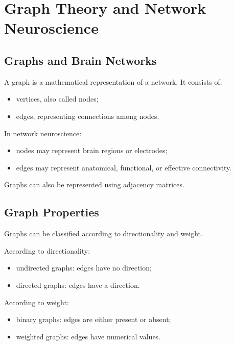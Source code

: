 \section{Graph Theory and Network Neuroscience}

\subsection{Graphs and Brain Networks}

A graph is a mathematical representation of a network. It consists of:

\begin{itemize}[noitemsep]
    \item vertices, also called nodes;
    \item edges, representing connections among nodes.
\end{itemize}

In network neuroscience:

\begin{itemize}[noitemsep]
    \item nodes may represent brain regions or electrodes;
    \item edges may represent anatomical, functional, or effective connectivity.
\end{itemize}

Graphs can also be represented using adjacency matrices.

\subsection{Graph Properties}

Graphs can be classified according to directionality and weight.

According to directionality:

\begin{itemize}[noitemsep]
    \item undirected graphs: edges have no direction;
    \item directed graphs: edges have a direction.
\end{itemize}

According to weight:

\begin{itemize}[noitemsep]
    \item binary graphs: edges are either present or absent;
    \item weighted graphs: edges have numerical values.
\end{itemize}

